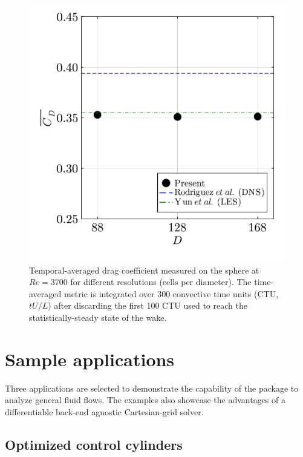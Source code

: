 \documentclass[final,3p,times]{elsarticle}
\begin{document}
\begin{figure}[!ht]
  \centering
  \includegraphics[width=0.4\linewidth]{img/sphere_validation.pdf}
\caption{Temporal-averaged drag coefficient measured on the sphere at $Re=3700$ for different resolutions (cells per diameter). The time-averaged metric is integrated over 300 convective time units (CTU, $tU/L$) after discarding the first 100 CTU used to reach the statistically-steady state of the wake.}
\label{fig:sphere_val}
\end{figure}

\section{Sample applications}\label{sec:applications}
Three applications are selected to demonstrate the capability of the package to analyze general fluid flows. The examples also showcase the advantages of a differentiable back-end agnostic Cartesian-grid solver.

\subsection{Optimized control cylinders}
\end{document}
